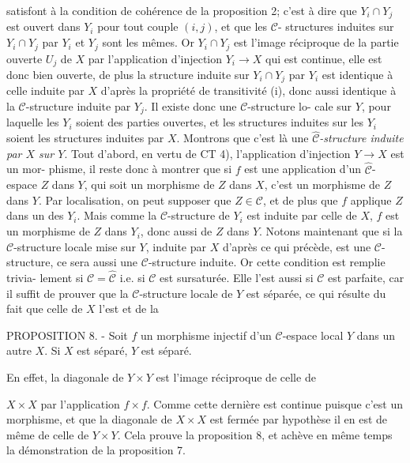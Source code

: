 satisfont à la condition de cohérence de la proposition 2; c'est à dire
que $Y_i \cap Y_j$ est ouvert dans $Y_i$ pour tout couple $(i,j)$, et que les $\mathcal{C}$-
structures induites sur $Y_i \cap Y_j$ par $Y_i$ et $Y_j$ sont les mêmes. Or $Y_i \cap Y_j$
est l'image réciproque de la partie ouverte $U_j$ de $X$ par l'application
d'injection $Y_i \to X$ qui est continue, elle est donc bien ouverte, de plus
la structure induite sur $Y_i \cap Y_j$ par $Y_i$ est identique à celle induite
par $X$ d'après la propriété de transitivité (i), donc aussi identique à
la $\mathcal{C}$-structure induite par $Y_j$. Il existe donc une $\mathcal{C}$-structure lo-
cale sur $Y$, pour laquelle les $Y_i$ soient des parties ouvertes, et les
structures induites sur les $Y_i$ soient les structures induites par $X$.
Montrons que c'est là une \emph{$\hat{\mathcal{C}}$-structure induite par $X$ sur $Y$}. Tout
d'abord, en vertu de CT 4), l'application d'injection $Y \to X$ est un mor-
phisme, il reste donc à montrer que si $f$ est une application d'un $\hat{\mathcal{C}}$-
espace $Z$ dans $Y$, qui soit un morphisme de $Z$ dans $X$, c'est un morphisme
de $Z$ dans $Y$. Par localisation, on peut supposer que $Z \in \mathcal{C}$, et de plus
que $f$ applique $Z$ dans un des $Y_i$. Mais comme la $\mathcal{C}$-structure de $Y_i$ est
induite par celle de $X$, $f$ est un morphisme de $Z$ dans $Y_i$, donc aussi de
$Z$ dans $Y$. Notons maintenant que si la $\mathcal{C}$-structure locale mise sur $Y$,
induite par $X$ d'après ce qui précède, est une $\mathcal{C}$-structure, ce sera
aussi une $\mathcal{C}$-structure induite. Or cette condition est remplie trivia-
lement si $\mathcal{C} = \hat{\mathcal{C}}$ i.e. si $\mathcal{C}$ est sursaturée. Elle l'est aussi si $\mathcal{C}$ est
parfaite, car il suffit de prouver que la $\mathcal{C}$-structure locale de $Y$
est séparée, ce qui résulte du fait que celle de $X$ l'est et de la

PROPOSITION 8. - Soit $f$ un morphisme injectif d'un $\mathcal{C}$-espace local $Y$
dans un autre $X$. Si $X$ est séparé, $Y$ est séparé.

En effet, la diagonale de $Y \times Y$ est l'image réciproque de celle de

\newpage



$X \times X$ par l'application $f \times f$. Comme cette dernière est continue puisque
c'est un morphisme, et que la diagonale de $X \times X$ est fermée par hypothèse
il en est de même de celle de $Y \times Y$. Cela prouve la proposition 8, et
achève en même temps la démonstration de la proposition 7.


